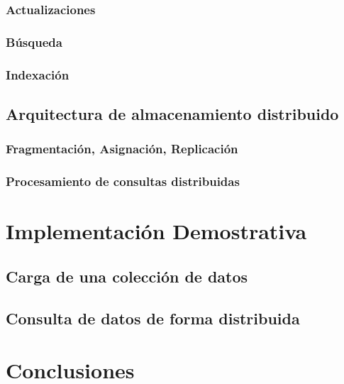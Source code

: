 \documentclass{article}
\begin{document}
            \subsubsection{Actualizaciones}
            \subsubsection{Búsqueda}
            \subsubsection{Indexación} 
        \subsection{Arquitectura de almacenamiento distribuido}
            \subsubsection{Fragmentación, Asignación, Replicación}
            \subsubsection{Procesamiento de consultas distribuidas}
    \section{Implementación Demostrativa}
        \subsection{Carga de una colección de datos}
        \subsection{Consulta de datos de forma distribuida}
    \section{Conclusiones}

    \newpage

    
    
\end{document}

